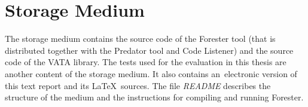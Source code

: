 \chapter{Storage Medium}
The storage medium contains the source code of
the Forester tool (that is distributed together with the Predator tool
and Code Listener)
and the source code of the VATA library.
The tests used for the evaluation in this thesis are
another content of the storage medium.
It also contains an~electronic version of this text report
and its \LaTeX\ sources.
The file \emph{README} describes the structure
of the medium and the instructions for compiling
and running Forester.


